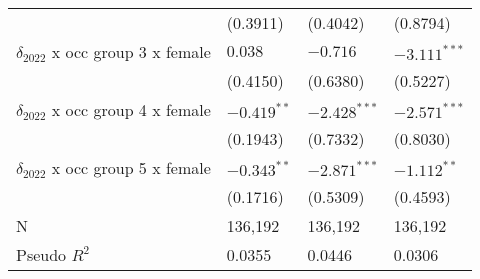 \begin{tabular}{llll}
                                       &           (0.3911) &           (0.4042) &           (0.8794) \\
$\delta_{2022}$ x occ group 3 x female &            $0.038$ &           $-0.716$ &     $-3.111^{***}$ \\
                                       &           (0.4150) &           (0.6380) &           (0.5227) \\
$\delta_{2022}$ x occ group 4 x female &      $-0.419^{**}$ &     $-2.428^{***}$ &     $-2.571^{***}$ \\
                                       &           (0.1943) &           (0.7332) &           (0.8030) \\
$\delta_{2022}$ x occ group 5 x female &      $-0.343^{**}$ &     $-2.871^{***}$ &      $-1.112^{**}$ \\
                                       &           (0.1716) &           (0.5309) &           (0.4593) \\
\midrule
N                                      &            136,192 &            136,192 &            136,192 \\
Pseudo $R^2$                           &             0.0355 &             0.0446 &             0.0306 \\
\bottomrule
\end{tabular}
